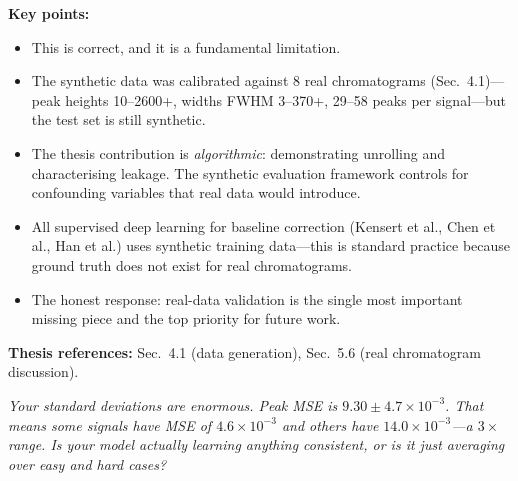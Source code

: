 \documentclass[11pt, letterpaper]{article}
\newcounter{qcounter}
\newcommand{\question}[1]{%
  \stepcounter{qcounter}%
  \begin{questionbox}[Q\theqcounter]%
    \itshape #1%
  \end{questionbox}%
}
\begin{document}
\begin{answerbox}
\textbf{Key points:}
\begin{itemize}[nosep]
  \item This is correct, and it is a fundamental limitation.
  \item The synthetic data was calibrated against 8 real chromatograms
        (Sec.~4.1)---peak heights 10--2600+, widths FWHM 3--370+,
        29--58 peaks per signal---but the test set is still synthetic.
  \item The thesis contribution is \emph{algorithmic}: demonstrating
        unrolling and characterising leakage.  The synthetic evaluation
        framework controls for confounding variables that real data
        would introduce.
  \item All supervised deep learning for baseline correction
        (Kensert et al., Chen et al., Han et al.) uses synthetic
        training data---this is standard practice because ground truth
        does not exist for real chromatograms.
  \item The honest response: real-data validation is the single most
        important missing piece and the top priority for future work.
\end{itemize}
\textbf{Thesis references:} Sec.~4.1 (data generation), Sec.~5.6 (real chromatogram discussion).
\end{answerbox}

\question{Your standard deviations are enormous.  Peak MSE is $9.30
\pm 4.7 \times 10^{-3}$.  That means some signals have MSE of
$4.6 \times 10^{-3}$ and others have $14.0 \times 10^{-3}$---a
$3\times$ range.  Is your model actually learning anything consistent,
or is it just averaging over easy and hard cases?}
\end{document}

